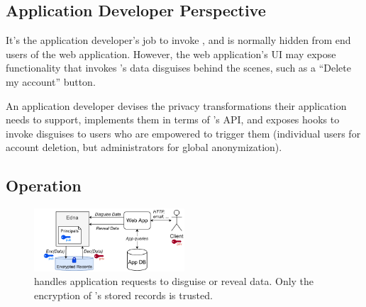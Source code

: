 \subsection{Application Developer Perspective}
%
It's the application developer's job to invoke \sys, and \sys is normally
hidden from end users of the web application.
%
However, the web application's UI may expose functionality that invokes \sys's
data disguises behind the scenes, such as a ``Delete my account'' button.
%

%
An application developer devises the privacy transformations their application needs to
support, implements them in terms of \sys's API, and exposes hooks to invoke disguises to
users who are empowered to trigger them (\eg individual users for account deletion, but
administrators for global anonymization).
%

\subsection{\sys Operation}

\begin{figure}[t]
  \centering
    \includegraphics[width=0.5\textwidth]{figs/edna_arch}
  \caption{\sys handles application requests to disguise or reveal data. Only the
    encryption of \sys's stored records is trusted.}
  \label{f:edna-overview}
\end{figure}
